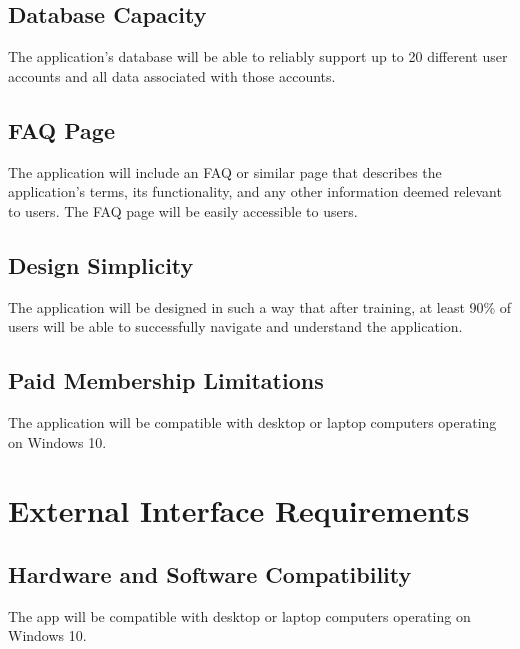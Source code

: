 \documentclass{scrreprt}
\begin{document}
\subsection{Database Capacity}
The application’s database will be able to reliably support up to 20 different user accounts and all data associated with those accounts. 

\subsection{FAQ Page}
The application will include an FAQ or similar page that describes the application’s terms, its functionality, and any other information deemed relevant to users. The FAQ page will be easily accessible to users.

\subsection{Design Simplicity}
The application will be designed in such a way that after training, at least 90\% of users will be able to successfully navigate and understand the application. 

\subsection{Paid Membership Limitations}
The application will be compatible with desktop or laptop computers operating on Windows 10.

\section{External Interface Requirements}

\subsection{Hardware and Software Compatibility}
The app will be compatible with desktop or laptop computers operating on Windows 10.



\end{document}
